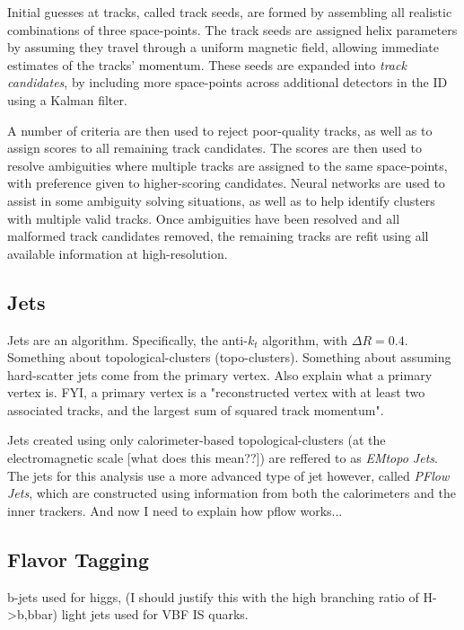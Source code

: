         Initial guesses at tracks, called track seeds, are formed by assembling all realistic combinations of three space-points.
        The track seeds are assigned helix parameters by assuming they travel through a uniform magnetic field,
            allowing immediate estimates of the tracks' momentum.
        These seeds are expanded into \textit{track candidates},
            by including more space-points across additional detectors in the ID using a Kalman filter.

        A number of criteria are then used to reject poor-quality tracks, as well as to assign scores to all remaining track candidates.
        The scores are then used to resolve ambiguities where multiple tracks are assigned to the same space-points,
            with preference given to higher-scoring candidates.
        Neural networks are used to assist in some ambiguity solving situations,
            as well as to help identify clusters with multiple valid tracks.
        Once ambiguities have been resolved and all malformed track candidates removed,
            the remaining tracks are refit using all available information at high-resolution.
        \cite{atlas_track_reco_performance}

    \subsection{Jets}
        Jets are an algorithm.
        Specifically, the anti-$k_t$ algorithm, with $\Delta R = 0.4$.
        Something about topological-clusters (topo-clusters).
        \cite{anti_kt}
        Something about assuming hard-scatter jets come from the primary vertex.
        Also explain what a primary vertex is.
        FYI, a primary vertex is a "reconstructed vertex with at least two associated tracks, and the largest sum of squared track momentum".

        Jets created using only calorimeter-based topological-clusters (at the electromagnetic scale [what does this mean??]) %
            are reffered to as \textit{EMtopo Jets}.
        The jets for this analysis use a more advanced type of jet however, called \textit{PFlow Jets},
            which are constructed using information from both the calorimeters and the inner trackers.
        And now I need to explain how pflow works...
        \cite{pflow}
        \cite{jet_energy_scale13TeV}

    \subsection{Flavor Tagging}
        b-jets used for higgs, (I should justify this with the high branching ratio of H->b,bbar)
        light jets used for VBF IS quarks.
        \cite{bjet_id_and_performance}

